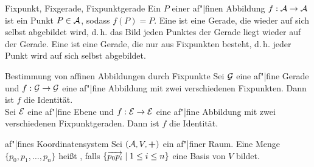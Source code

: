\begin{Def}{Fixpunkt, Fixgerade, Fixpunktgerade}
    Ein  $P$ einer af"|finen Abbildung
    $f: \mathcal{A} \rightarrow \mathcal{A}$ ist ein Punkt $P \in \mathcal{A}$,
    sodass $f(P) = P$.
    Eine  ist eine Gerade, die wieder auf sich selbst
    abgebildet wird, d.\,h. das Bild jeden Punktes der Gerade liegt wieder auf
    der Gerade.
    Eine  ist eine Gerade, die nur aus Fixpunkten
    besteht, d.\,h. jeder Punkt wird auf sich selbst abgebildet.
\end{Def}

\begin{Satz}{Bestimmung von af{}finen Abbildungen durch Fixpunkte}
    Sei $\mathcal{G}$ eine af"|fine Gerade und
    $f: \mathcal{G} \rightarrow \mathcal{G}$
    eine af"|fine Abbildung mit zwei verschiedenen Fixpunkten.
    Dann ist $f$ die Identität. \\
    Sei $\mathcal{E}$ eine af"|fine Ebene und
    $f: \mathcal{E} \rightarrow \mathcal{E}$
    eine af"|fine Abbildung mit zwei verschiedenen Fixpunktgeraden.
    Dann ist $f$ die Identität.
\end{Satz}

\begin{Def}{af"|fines Koordinatensystem}
    Sei $(\mathcal{A}, V, \boldsymbol{+})$ ein af"|finer Raum.
    Eine Menge $\{p_0, p_1, \ldots, p_n\}$ heißt
    , falls
    $\{\overrightarrow{p_0 p_i} \;|\; 1 \le i \le n\}$ eine Basis von $V$ bildet.
\end{Def}

\pagebreak
